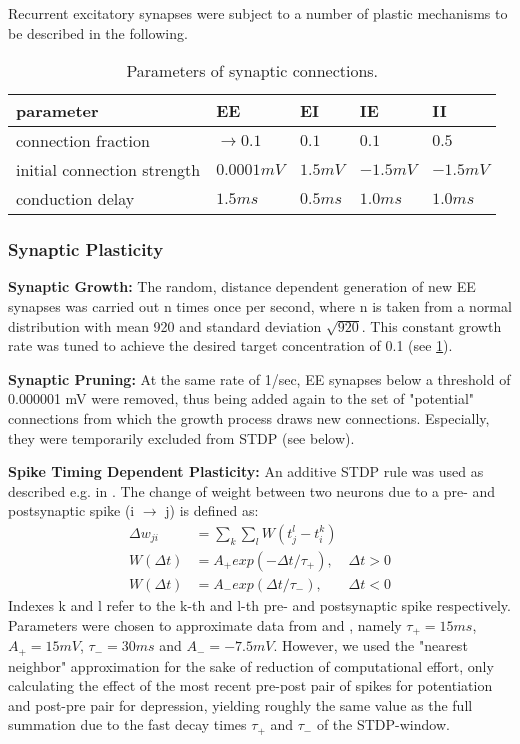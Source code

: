 \documentclass[10pt,a4paper]{article}
\begin{document}
Recurrent excitatory synapses were subject to a number of plastic mechanisms to be described in the following. 

\begin{table}
\begin{tabular}{|l|l|l|l|l|}
\hline
\textbf{parameter} & \textbf{EE} & \textbf{EI} & \textbf{IE} & \textbf{II} \\ \hline
connection fraction & $\rightarrow 0.1$ & $0.1$ & $0.1$ & $0.5$ \\ \hline
initial connection strength & $0.0001 mV$ & $1.5 mV$ & $-1.5 mV$ & $-1.5 mV$ \\ \hline
conduction delay & $1.5 ms$ & $0.5 ms$ & $1.0 ms$ & $1.0 ms$ \\
\hline
\end{tabular}
\caption{Parameters of synaptic connections.}
\label{syn_conn_params}
\end{table}
\newpage
\subsubsection{Synaptic Plasticity}
\textbf{Synaptic Growth:} The random, distance dependent generation of new EE synapses was carried out n times once per second, where n is taken from a normal distribution with mean 920 and standard deviation $\sqrt{920}$. This constant growth rate was tuned to achieve the desired target concentration of 0.1 (see \ref{syn_conn_params}).

\textbf{Synaptic Pruning:} At the same rate of 1/sec, EE synapses below a threshold of 0.000001 mV were removed, thus being added again to the set of "potential" connections from which the growth process draws new connections. Especially, they were temporarily excluded from STDP (see below).

\textbf{Spike Timing Dependent Plasticity:} An additive STDP rule was used as described e.g. in \cite{Zhang_STDP}. The change of weight between two neurons due to a pre- and postsynaptic spike (i $\rightarrow$ j) is defined as:
\begin{align}
\Delta w_{ji} &= \sum_k \sum_l W(t_j^l - t_i^k) \label{STDP_rule} \\
W(\Delta t) &= A_{+} exp(-\Delta t / \tau_{+}), & \Delta t > 0 \label{STDP_pos} \\
W(\Delta t) &= A_{-} exp(\Delta t / \tau_{-}), & \Delta t < 0 \label{STDP_neg}
\end{align}
Indexes k and l refer to the k-th and l-th pre- and postsynaptic spike respectively. Parameters were chosen to approximate data from \cite{Bi_Poo_STDP} and \cite{Froemke_STDP}, namely $\tau_{+} = 15 ms$, $A_{+} = 15 mV$, $\tau_{-} = 30 ms$ and $A_{-} = -7.5 mV$. However, we used the "nearest neighbor" approximation for the sake of reduction of computational effort, only calculating the effect of the most recent pre-post pair of spikes for potentiation and post-pre pair for depression, yielding roughly the same value as the full summation due to the fast decay times $\tau_{+}$ and $\tau_{-}$ of the STDP-window.
\end{document}
